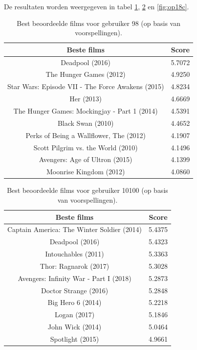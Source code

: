 \restoregeometry
\newpage



De resultaten worden weergegeven in tabel \ref{fig:op18a}, \ref{fig:op18b} en \ref{fig:op18c}.


\begin{table}[H]
\centering
\begin{tabular}{c|c}
\textbf{Beste films} & \textbf{Score} \\
\hline
    Deadpool (2016)                                   & 5.7072 \\
    The Hunger Games (2012)                           & 4.9250 \\
    Star Wars: Episode VII - The Force Awakens (2015) & 4.8234 \\
    Her (2013)                                        & 4.6669 \\
    The Hunger Games: Mockingjay - Part 1 (2014)      & 4.5391 \\
    Black Swan (2010)                                 & 4.4652 \\
    Perks of Being a Wallflower, The (2012)           & 4.1907 \\
    Scott Pilgrim vs. the World (2010)                & 4.1496 \\
    Avengers: Age of Ultron (2015)                    & 4.1399 \\
    Moonrise Kingdom (2012)                           & 4.0860 
\end{tabular}
\caption{Best beoordeelde films voor gebruiker 98 (op basis van voorspellingen).}
\label{fig:op18a}
\end{table}

\begin{table}[H]
\centering
\begin{tabular}{c|c}
\textbf{Beste films} & \textbf{Score} \\
\hline
    Captain America: The Winter Soldier (2014) & 5.4375 \\
    Deadpool (2016)                            & 5.4323 \\
    Intouchables (2011)                        & 5.3363 \\
    Thor: Ragnarok (2017)                      & 5.3028 \\
    Avengers: Infinity War - Part I (2018)     & 5.2873 \\
    Doctor Strange (2016)                      & 5.2848 \\
    Big Hero 6 (2014)                          & 5.2218 \\
    Logan (2017)                               & 5.1846 \\
    John Wick (2014)                           & 5.0464 \\
    Spotlight (2015)                           & 4.9661 
\end{tabular}
\caption{Best beoordeelde films voor gebruiker 10100 (op basis van voorspellingen).}
\label{fig:op18b}
\end{table}

